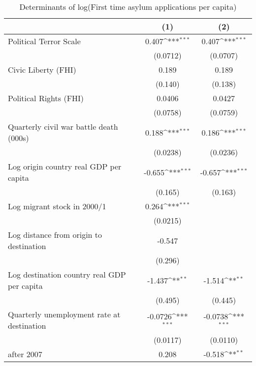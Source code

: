 \begin{table}[htbp]\centering
\def\sym#1{\ifmmode^{#1}\else\(^{#1}\)\fi}
\caption{Determinants of log(First time asylum applications per capita)}
\begin{tabular}{l*{2}{c}}
\hline\hline
                    &\multicolumn{1}{c}{(1)}         &\multicolumn{1}{c}{(2)}         \\
\hline
Political Terror Scale&       0.407\sym{***}&       0.407\sym{***}\\
                    &    (0.0712)         &    (0.0707)         \\
[1em]
Civic Liberty (FHI) &       0.189         &       0.189         \\
                    &     (0.140)         &     (0.138)         \\
[1em]
Political Rights (FHI)&      0.0406         &      0.0427         \\
                    &    (0.0758)         &    (0.0759)         \\
[1em]
Quarterly civil war battle death (000s)&       0.188\sym{***}&       0.186\sym{***}\\
                    &    (0.0238)         &    (0.0236)         \\
[1em]
Log origin country real GDP per capita&      -0.655\sym{***}&      -0.657\sym{***}\\
                    &     (0.165)         &     (0.163)         \\
[1em]
Log migrant stock in 2000/1&       0.264\sym{***}&                     \\
                    &    (0.0215)         &                     \\
[1em]
Log distance from origin to destination&      -0.547         &                     \\
                    &     (0.296)         &                     \\
[1em]
Log destination country real GDP per capita&      -1.437\sym{**} &      -1.514\sym{**} \\
                    &     (0.495)         &     (0.445)         \\
[1em]
Quarterly unemployment rate at destination&     -0.0726\sym{***}&     -0.0738\sym{***}\\
                    &    (0.0117)         &    (0.0110)         \\
[1em]
after 2007          &       0.208         &      -0.518\sym{**} \\

\end{tabular}
\end{table}
